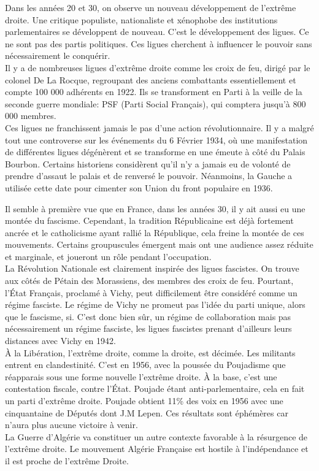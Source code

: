 \documentclass[10pt, a4paper, openany]{book}
\begin{document}
Dans les années 20 et 30, on observe un nouveau développement de l'extrême droite. Une critique populiste, nationaliste et xénophobe des institutions parlementaires se développent de nouveau. C'est le développement des ligues. Ce ne sont pas des partis politiques. Ces ligues cherchent à influencer le pouvoir sans nécessairement le conquérir. \\
Il y a de nombreuses ligues d'extrême droite comme les croix de feu, dirigé par le colonel De La Rocque, regroupant des anciens combattants essentiellement et compte 100 000 adhérents en 1922. Ils se transforment en Parti à la veille de la seconde guerre mondiale: PSF (Parti Social Français), qui comptera jusqu'à 800 000 membres. \\
Ces ligues ne franchissent jamais le pas  d'une action révolutionnaire. Il y a malgré tout une controverse sur les événements du 6 Février 1934, où une manifestation de différentes ligues dégénèrent et se transforme en une émeute à côté du Palais Bourbon. Certains historiens considèrent qu'il n'y a jamais eu de volonté de prendre d'assaut le palais et de renversé le pouvoir. Néanmoins, la Gauche a utilisée cette date pour cimenter son Union du front populaire en 1936. 


Il semble à première vue que en France, dans les années 30, il y ait aussi eu une montée du fascisme. Cependant, la tradition Républicaine est déjà fortement ancrée et le catholicisme ayant rallié la République, cela freine la montée de ces mouvements. Certains groupuscules émergent mais ont une audience assez réduite et marginale, et joueront un rôle pendant l'occupation. \\
La Révolution Nationale est clairement inspirée des ligues fascistes. On trouve aux côtés de Pétain des Morassiens, des membres des croix de feu. Pourtant, l'État Français, proclamé à Vichy, peut difficilement être considéré comme un régime fasciste. Le régime de Vichy ne promeut pas l'idée du parti unique, alors que le fascisme, si. C'est donc bien sûr, un régime de collaboration mais pas nécessairement un régime fasciste, les ligues fascistes prenant d'ailleurs leurs distances avec Vichy en 1942. \\
À la Libération, l'extrême droite, comme la droite, est décimée. Les militants entrent en clandestinité. C'est en 1956, avec la poussée du Poujadisme que réapparais sous une forme nouvelle l'extrême droite. À la base, c'est une contestation fiscale, contre l'État. Poujade étant anti-parlementaire, cela en fait un parti d'extrême droite. Poujade obtient 11\% des voix en 1956 avec une cinquantaine de Députés dont J.M Lepen. Ces résultats sont éphémères car n'aura plus aucune victoire à venir. \\
La Guerre d'Algérie va constituer un autre contexte favorable à la résurgence de l'extrême droite. Le mouvement Algérie Française est hostile à l'indépendance et il est proche de l'extrême Droite. 
\end{document}
